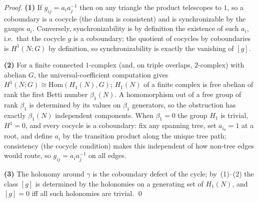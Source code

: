 \documentclass[12pt,oneside]{amsbook}
\theoremstyle{plain}
\theoremstyle{definition}
\theoremstyle{remark}
\begin{document}
\begin{proof}
\textbf{(1)}  If $g_{ij} = a_i a_j^{-1}$ then on any triangle the
product telescopes to $1$, so a coboundary is a cocycle (the datum
is consistent) and is synchronizable by the gauges $a_i$.
Conversely, synchronizability is by definition the existence of
such $a_i$, i.e.\ that the cocycle $g$ is a coboundary; the
quotient of cocycles by coboundaries is $H^1(N;G)$ by definition,
so synchronizability is exactly the vanishing of $[g]$.

\textbf{(2)}  For a finite connected $1$-complex (and, on triple
overlaps, $2$-complex) with abelian $G$, the universal-coefficient
computation gives $H^1(N;G) \cong \mathrm{Hom}(H_1(N), G)$;
$H_1(N)$ of a finite complex is free abelian of rank the first
Betti number $\beta_1(N)$.  A homomorphism out of a free group of
rank $\beta_1$ is determined by its values on $\beta_1$
generators, so the obstruction has exactly $\beta_1(N)$
independent components.  When $\beta_1 = 0$ the group $H_1$ is
trivial, $H^1 = 0$, and every cocycle is a coboundary: fix any
spanning tree, set $a_{i_0} = 1$ at a root, and define $a_i$ by
the transition product along the unique tree path; consistency
(the cocycle condition) makes this independent of how non-tree
edges would route, so $g_{ij} = a_i a_j^{-1}$ on all edges.

\textbf{(3)}  The holonomy around $\gamma$ is the coboundary
defect of the cycle; by~(1)--(2) the class $[g]$ is determined by
the holonomies on a generating set of $H_1(N)$, and
$[g] = 0$ iff all such holonomies are trivial. \qed
\end{proof}
\end{document}
